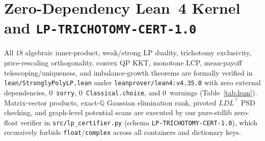 \documentclass[11pt,a4paper]{article}
\theoremstyle{definition}
\theoremstyle{remark}
\newcommand{\QQ}{\mathbb{Q}}
\newcommand{\certschema}{\texttt{LP-TRICHOTOMY-CERT-1.0}}
\begin{document}
\section{Zero-Dependency Lean~4 Kernel and \texorpdfstring{\certschema{}}{LP-TRICHOTOMY-CERT-1.0}}\label{sec:lean}

All $18$ algebraic inner-product, weak/strong LP duality, trichotomy exclusivity, price-rescaling orthogonality, convex QP KKT, monotone LCP, mean-payoff telescoping/uniqueness, and imbalance-growth theorems are formally verified in \texttt{lean/StronglyPolyLP.lean} under \texttt{leanprover/lean4:v4.35.0} with zero external dependencies, $0$~\texttt{sorry}, $0$~\texttt{Classical.choice}, and $0$~warnings (Table~\ref{tab:lean}). Matrix-vector products, exact-$\QQ$ Gaussian elimination rank, pivoted $LDL^\top$ PSD checking, and graph-level potential scans are executed by our pure-stdlib zero-float verifier in \texttt{src/lp\_certifier.py} (schema \certschema{}), which recursively forbids \texttt{float}/\texttt{complex} across all containers and dictionary keys.
\end{document}
